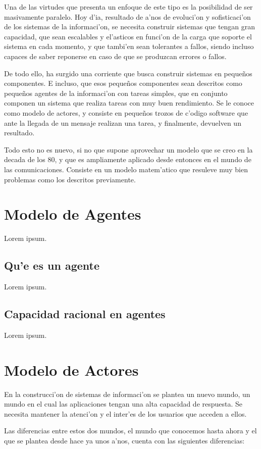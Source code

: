 \documentclass[12pt]{article}
\begin{document}
Una de las virtudes que presenta un enfoque de este tipo es la posibilidad de ser masivamente
paralelo. Hoy d'ia, resultado de a'nos de evoluci'on y sofisticaci'on de los sistemas de la informaci'on,
se necesita construir sistemas que tengan gran capacidad, que sean escalables y el'asticos
en funci'on de la carga que soporte el sistema en cada momento, y que tambi'en sean tolerantes
a fallos, siendo incluso capaces de saber reponerse en caso de que se produzcan errores o fallos.

De todo ello, ha surgido una corriente que busca construir sistemas en pequeños componentes. E incluso,
que esos pequeños componentes sean descritos como pequeños agentes de la informaci'on con tareas simples,
que en conjunto componen un sistema que realiza tareas con muy buen rendimiento. Se le conoce como modelo de
actores, y consiste en pequeños trozos de c'odigo software que ante la llegada de un mensaje realizan
una tarea, y finalmente, devuelven un resultado.

Todo esto no es nuevo, si no que supone aprovechar un modelo que se creo en la decada de los 80, y
que es ampliamente aplicado desde entonces en el mundo de las comunicaciones. Consiste en un
modelo matem'atico que resuleve muy bien problemas como los descritos previamente.

\section{Modelo de Agentes}
\label{sec:modelo de agentes}
Lorem ipsum.
\subsection{Qu'e es un agente}
\label{sub:que es un agente}
Lorem ipsum.
\subsection{Capacidad racional en agentes}
\label{sub:capacidad racional en agentes}
Lorem ipsum.
\section{Modelo de Actores}
\label{sec:modelos de actores}
En la construcci'on de sistemas de informaci'on se plantea un nuevo mundo, un mundo en el cual
las aplicaciones tengan una alta capacidad de respuesta. Se necesita mantener la atenci'on y el
inter'es de los usuarios que acceden a ellos.

Las diferencias entre estos dos mundos, el mundo que conocemos hasta ahora y el que se plantea
desde hace ya unos a'nos, cuenta con las siguientes diferencias:
\end{document}
